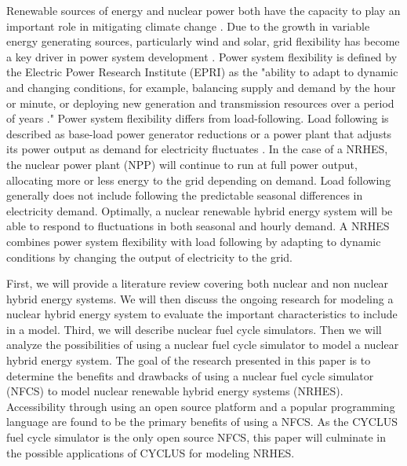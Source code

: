 \documentclass{article}                                                                           %
\begin{document}
\begin{linenumbers}
Renewable sources of energy and nuclear power both have the capacity to play an important role in mitigating climate change \cite {IPCC}. Due to the growth in variable energy generating sources, particularly wind and solar, grid flexibility has become a key driver in power system development \cite {Denholm2011}. Power system flexibility is defined by the Electric Power Research Institute (EPRI) as the "ability to adapt to dynamic and changing conditions, for example, balancing supply and demand by the hour or minute, or deploying new generation and transmission resources over a period of years \cite{EPRI2016}." Power system flexibility differs from load-following.  Load following is described as base-load power generator reductions \cite{Bragg-Sitton2014} or a power plant that adjusts its power output as demand for electricity fluctuates \cite{Masters2004}. In the case of a NRHES, the nuclear power plant (NPP) will continue to run at full power output, allocating more or less energy to the grid depending on demand. Load following generally does not include following the predictable seasonal differences in electricity demand.  Optimally, a nuclear renewable hybrid energy system will be able to respond to fluctuations in both seasonal and hourly demand. A NRHES combines power system flexibility with load following by adapting to dynamic conditions by changing the output of electricity to the grid.

First, we will provide a literature review covering both nuclear and non nuclear hybrid energy systems.  We will then discuss the ongoing research for modeling a nuclear hybrid energy system to evaluate the important characteristics to include in a model. Third, we will describe nuclear fuel cycle simulators. Then we will analyze the possibilities of using a nuclear fuel cycle simulator to model a nuclear hybrid energy system. The goal of the research presented in this paper is to determine the benefits and drawbacks of using a nuclear fuel cycle simulator (NFCS) to model nuclear renewable hybrid energy systems (NRHES).  Accessibility through using an open source platform and a popular programming language are found to be the primary benefits of using a NFCS. As the CYCLUS fuel cycle simulator is the only open source NFCS, this paper will culminate in the possible applications of CYCLUS for modeling NRHES.


\end{linenumbers}
\end{document}
